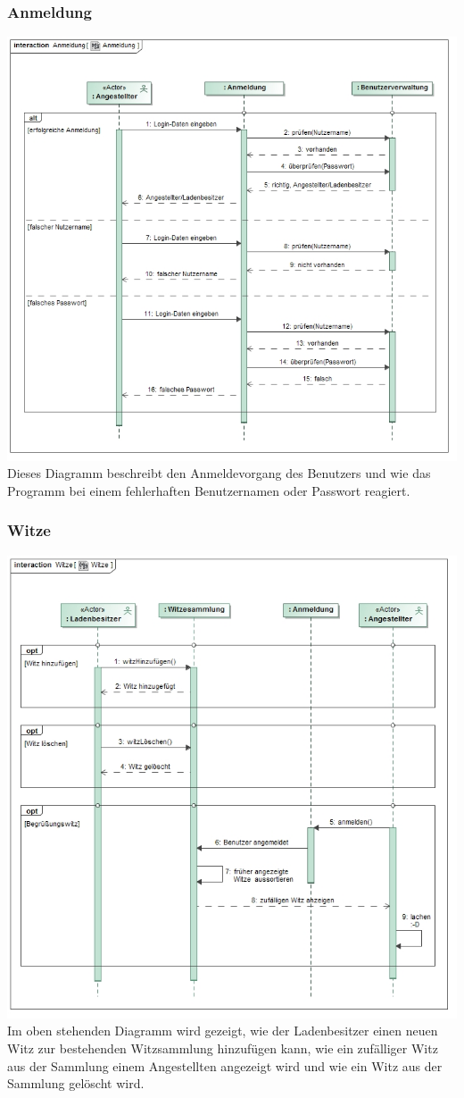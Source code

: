 \documentclass[pdftex,12pt,a4paper]{article}
\begin{document}
\subsubsection*{Anmeldung}
\includegraphics[width=1\textwidth]{../Pflichtenheft/images/anmeldung}
Dieses Diagramm beschreibt den Anmeldevorgang des Benutzers und wie das Programm bei einem fehlerhaften Benutzernamen oder Passwort reagiert.
\subsubsection*{Witze}
\includegraphics[width=1\textwidth]{../Pflichtenheft/images/witze}
Im oben stehenden Diagramm wird gezeigt, wie der Ladenbesitzer einen neuen Witz zur bestehenden Witzsammlung hinzufügen kann, wie ein zufälliger Witz aus der Sammlung einem Angestellten angezeigt wird und wie ein Witz aus der Sammlung gelöscht wird.
\end{document}
